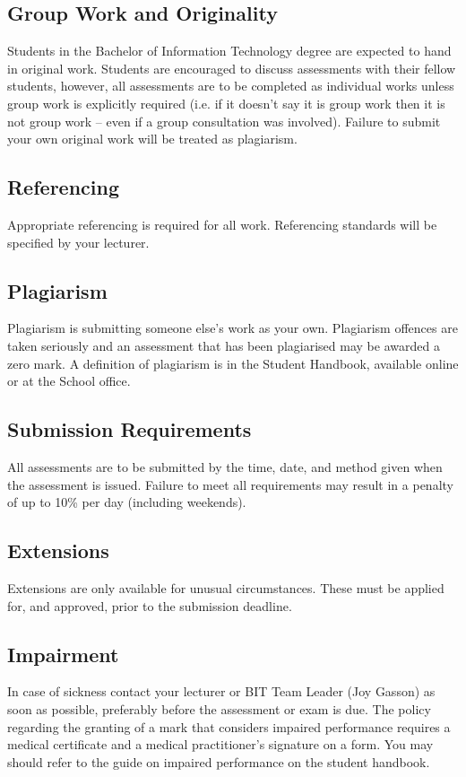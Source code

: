 \documentclass{article}
\begin{document}
\subsection*{Group Work and Originality}
Students in the Bachelor of Information Technology degree are expected to hand in original work. Students are encouraged to discuss assessments with their fellow students, however, all assessments are to be completed as individual works unless group work is explicitly required (i.e. if it doesn’t say it is group work then it is not group work – even if a group consultation was involved). Failure to submit your own original work will be treated as plagiarism.

\subsection*{Referencing}
Appropriate referencing is required for all work. Referencing standards will be specified by your lecturer.

\subsection*{Plagiarism}
Plagiarism is submitting someone else’s work as your own. Plagiarism offences are taken seriously and an assessment that has been plagiarised may be awarded a zero mark. A definition of plagiarism is in the Student Handbook, available online or at the School office.

\subsection*{Submission Requirements}
All assessments are to be submitted by the time, date, and method given when the assessment is issued. Failure to meet all requirements may result in a penalty of up to 10\% per day (including weekends).

\subsection*{Extensions}
Extensions are only available for unusual circumstances. These must be applied for, and approved, prior to the submission deadline.

\subsection*{Impairment}
In case of sickness contact your lecturer or BIT Team Leader (Joy Gasson) as soon as possible, preferably before the assessment or exam is due. The policy regarding the granting of a mark that considers impaired performance requires a medical certificate and a medical practitioner’s signature on a form. You may should refer to the guide on impaired performance on the student handbook.
\end{document}
